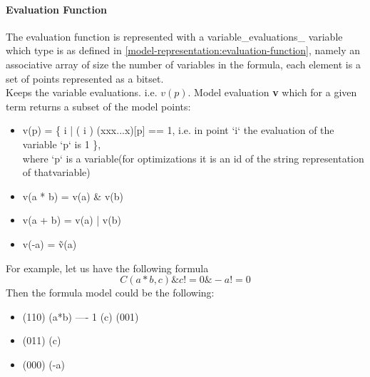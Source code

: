 \documentclass{article}
\begin{document}
		\paragraph{Evaluation Function} The evaluation function is represented with a variable\_evaluations\_ variable which type is as defined in \ref{model-representation:evaluation-function}, namely
			an associative array of size the number of variables in the formula, each element is a set of points represented as a bitset. \\
			Keeps the variable evaluations. i.e. $v(p)$. Model evaluation \textbf{v} which for a given term returns a subset of the model points: 
			\begin{itemize}
				\item v(p) = \{ i | ( i ) (xxx...x)[p] == 1, i.e. in point `i` the evaluation of the variable `p` is 1 \}, \\
					where `p` is a variable(for optimizations it is an id of the string representation of thatvariable)
				\item v(a * b) = v(a) \& v(b)
				\item v(a + b) = v(a) | v(b)
				\item v(-a) = \~v(a)
			\end{itemize}
			For example, let us have the following formula
			\begin{equation}
				C(a * b, c) \& c != 0 \& -a != 0
			\end{equation}
			Then the formula model could be the following:
			\begin{itemize}
				\item[] (110) (a*b) 	  ---- 1 (c) (001)
				\item[] (011) \:\: (c) \:   2
				\item[] (000) \:\:(-a) \:  3
			\end{itemize}
\end{document}
